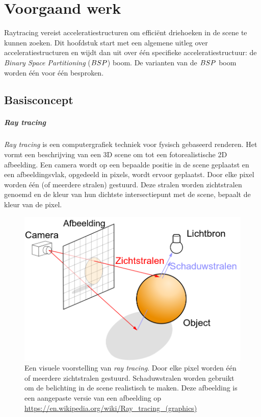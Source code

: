 \chapter{Voorgaand werk}
\label{hoofdstuk:voorgaand-werk}
Raytracing vereist acceleratiestructuren om efficiënt driehoeken in de scene te kunnen zoeken.
Dit hoofdstuk start met een algemene uitleg over acceleratiestructuren en wijdt dan uit over één specifieke acceleratiestructuur: de \textit{Binary Space Partitioning} ($BSP$) boom.
De varianten van de $BSP$ boom worden één voor één besproken.

\section{Basisconcept}
    
    \paragraph{Ray tracing}
    \textit{Ray tracing} is een computergrafiek techniek voor fysisch gebaseerd renderen. Het vormt een beschrijving van een 3D scene om tot een fotorealistische 2D afbeelding. Een camera wordt op een bepaalde positie in de scene geplaatst en een afbeeldingsvlak, opgedeeld in pixels, wordt ervoor geplaatst. Door elke pixel worden één (of meerdere stralen) gestuurd. Deze stralen worden zichtstralen genoemd en de kleur van hun dichtste intersectiepunt met de scene, bepaalt de kleur van de pixel.\\

    \begin{figure}
        \centering
        \includegraphics[width=0.5\linewidth]{img/ray-tracing}
        \caption{Een visuele voorstelling van \textit{ray tracing}. Door elke pixel worden één of meerdere zichtstralen gestuurd. Schaduwstralen worden gebruikt om de belichting in de scene realistisch te maken. Deze afbeelding is een aangepaste versie van een afbeelding op \url{https://en.wikipedia.org/wiki/Ray_tracing_(graphics)}}
        \label{fig:raytracing}    
    \end{figure}

